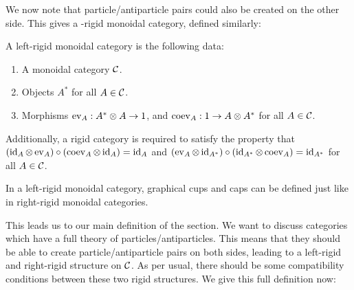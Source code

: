 We now note that particle/antiparticle pairs could also be created on the other side. This gives a -rigid monoidal category, defined similarly:

\begin{defn} A left-rigid monoidal category is the following data:

\begin{enumerate}
\item A monoidal category ${\mathcal C}$.
\item Objects $A^*$ for all $A\in {\mathcal C}$.
\item Morphisms $\operatorname{ev}_{A}: A^*\otimes A\to 1$, and $\operatorname{coev}_{A}: 1\to A\otimes A^*$ for all $A\in {\mathcal C}$.
\end{enumerate}

Additionally, a rigid category is required to satisfy the property that $(\operatorname{id}_A\otimes\operatorname{ev}_A)\circ (\operatorname{coev}_A\otimes \operatorname{id}_A)=\operatorname{id}_A$ and $(\operatorname{ev}_A\otimes \operatorname{id}_{A^*})\circ (\operatorname{id}_{A^*}\otimes \operatorname{coev}_{A})=\operatorname{id}_{A^*}$ for all $A\in {\mathcal C}$. 


\end{defn}

In a left-rigid monoidal category, graphical cups and caps can be defined just like in right-rigid monoidal categories.

This leads us to our main definition of the section. We want to discuss categories which have a full theory of particles/antiparticles. This means that they should be able to create particle/antiparticle pairs on both sides, leading to a left-rigid and right-rigid structure on ${\mathcal C}$. As per usual, there should be some compatibility conditions between these two rigid structures. We give this full definition now:

